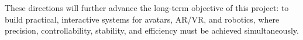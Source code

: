 \documentclass[a4paper,12pt]{article}
\begin{document}
These directions will further advance the long-term objective of this project: to build practical, interactive systems for avatars, AR/VR, and robotics, where precision, controllability, stability, and efficiency must be achieved simultaneously.







\end{document}
